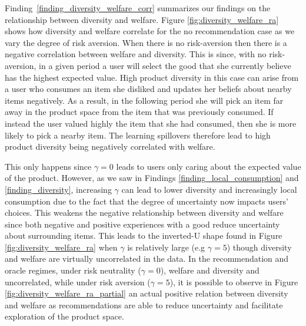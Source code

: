\documentclass[format=acmsmall, review=false]{acmart}
\begin{document}
Finding~\ref{finding_diversity_welfare_corr} summarizes our findings on the relationship between diversity and welfare. Figure \ref{fig:diversity_welfare_ra} shows how diversity and welfare correlate for the no recommendation case as we vary the degree of risk aversion. When there is no risk-aversion then there is a negative correlation between welfare and diversity. This is since, with no risk-aversion, in a given period a user will select the good that she currently believe has the highest expected value. High product diversity in this case can arise from a user who consumes an item she disliked and updates her beliefs about nearby items negatively. As a result, in the following period she will pick an item far away in the product space from the item that was previously consumed. If instead the user valued highly the item that she had consumed, then she is more likely to pick a nearby item. The learning spillovers therefore lead to high product diversity being negatively correlated with welfare.
\par
This only happens since $\gamma = 0$ leads to users only caring about the expected value of the product. However, as we saw in Findings \ref{finding_local_consumption} and \ref{finding_diversity}, increasing $\gamma$ can lead to lower diversity and increasingly local consumption due to the fact that the degree of uncertainty now impacts users' choices. This weakens the negative relationship between diversity and welfare since both negative and positive experiences with a good reduce uncertainty about surrounding items. This leads to the inverted-U shape found in Figure \ref{fig:diversity_welfare_ra} when $\gamma$ is relatively large (e.g $\gamma = 5$) though diversity and welfare are virtually uncorrelated in the data. In the recommendation and oracle regimes, under risk neutrality ($\gamma=0$), welfare and diversity and uncorrelated, while under risk aversion ($\gamma=5$), it is possible to observe in Figure \ref{fig:diversity_welfare_ra_partial} an actual positive relation between diversity and welfare as recommendations are able to reduce uncertainty and facilitate exploration of the product space.
\end{document}
